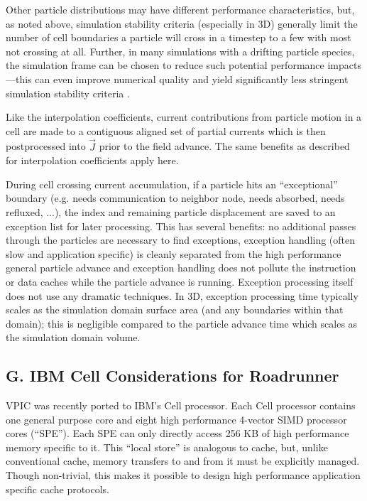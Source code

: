 \documentclass[letter,10pt]{article}
\newcommand{\vecJ}{\vec{J}}
\begin{document}
Other particle distributions may have different performance
characteristics, but, as noted above, simulation stability criteria
(especially in 3D) generally limit the number of cell boundaries a
particle will cross in a timestep to a few with most not crossing at
all.  Further, in many simulations with a drifting particle species,
the simulation frame can be chosen to reduce such potential
performance impacts---this can even improve numerical quality and
yield significantly less stringent simulation stability criteria
\cite{Vay_2007}.

Like the interpolation coefficients, current contributions from
particle motion in a cell are made to a contiguous aligned set of
partial currents which is then postprocessed into $\vecJ$ prior to the
field advance.  The same benefits as described for interpolation
coefficients apply here.

During cell crossing current accumulation, if a particle hits an
``exceptional'' boundary (e.g. needs communication to neighbor node,
needs absorbed, needs refluxed, ...), the index and remaining particle
displacement are saved to an exception list for later processing.
This has several benefits: no additional passes through the particles
are necessary to find exceptions, exception handling (often slow and
application specific) is cleanly separated from the high performance
general particle advance and exception handling does not pollute the
instruction or data caches while the particle advance is running.
Exception processing itself does not use any dramatic techniques.  In
3D, exception processing time typically scales as the simulation
domain surface area (and any boundaries within that domain); this is
negligible compared to the particle advance time which scales as the
simulation domain volume.

\subsection{G. IBM Cell Considerations for Roadrunner}

VPIC was recently ported to IBM's Cell processor.  Each Cell processor
contains one general purpose core and eight high performance 4-vector
SIMD processor cores (``SPE'').  Each SPE can only directly access 256
KB of high performance memory specific to it.  This ``local store'' is
analogous to cache, but, unlike conventional cache, memory transfers
to and from it must be explicitly managed.  Though non-trivial, this
makes it possible to design high performance application specific
cache protocols. \cite{Kahle_et_al_2005}
\end{document}
